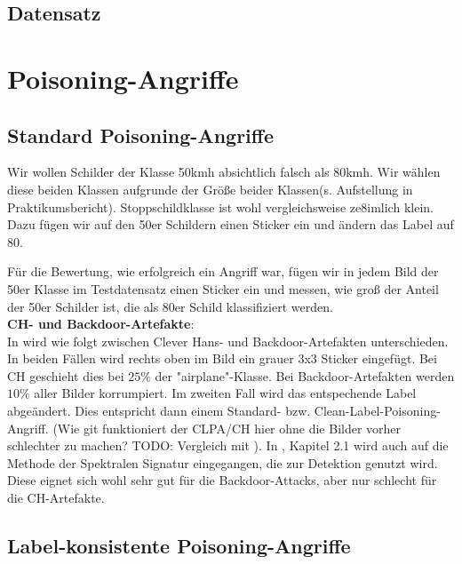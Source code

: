 \documentclass[twoside, 12pt,a4paper]{article}
\numberwithin{equation}{section}
\begin{document}
	\subsection{Datensatz}
	
	
	
	\section{Poisoning-Angriffe} \label{chapter_poisoningattacks}
	\subsection{Standard Poisoning-Angriffe}
	Wir wollen Schilder der Klasse 50kmh absichtlich falsch als 80kmh. Wir wählen diese beiden Klassen aufgrunde der Größe beider Klassen(s. Aufstellung in Praktikumsbericht). Stoppschildklasse ist wohl vergleichsweise ze8imlich klein.\\
	
	Dazu fügen wir auf den 50er Schildern einen Sticker ein und ändern das Label auf 80.
	
	Für die Bewertung, wie erfolgreich ein Angriff war, fügen wir in jedem Bild der 50er Klasse im Testdatensatz einen Sticker ein und messen, wie groß der Anteil der 50er Schilder ist, die als 80er Schild klassifiziert werden.\\
	
	\noindent \textbf{CH- und Backdoor-Artefakte}:\\
	In \cite{imagenet_unhansed_v2} wird wie folgt zwischen Clever Hans- und Backdoor-Artefakten unterschieden. In beiden Fällen wird rechts oben im Bild ein grauer 3x3 Sticker eingefügt.
	Bei CH geschieht dies bei $25 \%$ der "airplane"-Klasse. Bei Backdoor-Artefakten werden $10 \%$ aller Bilder korrumpiert. Im zweiten Fall wird das entspechende Label abgeändert. Dies entspricht dann einem Standard- bzw. Clean-Label-Poisoning-Angriff. (Wie git funktioniert der CLPA/CH hier ohne die Bilder vorher schlechter zu machen? TODO: Vergleich mit \cite{labelconsistent}). In \cite{imagenet_unhansed_v2}, Kapitel 2.1 wird auch auf die Methode der Spektralen Signatur \cite{spectral_signatures} eingegangen, die zur Detektion genutzt wird. Diese eignet sich wohl sehr gut für die Backdoor-Attacks, aber nur schlecht für die CH-Artefakte.
	
	
	\subsection{Label-konsistente Poisoning-Angriffe}
	
\end{document}
